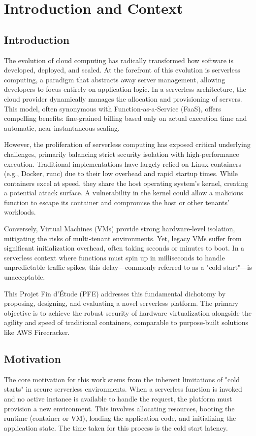 \chapter{Introduction and Context}

\section{Introduction}
The evolution of cloud computing has radically transformed how software is developed, deployed, and scaled. At the forefront of this evolution is serverless computing, a paradigm that abstracts away server management, allowing developers to focus entirely on application logic. In a serverless architecture, the cloud provider dynamically manages the allocation and provisioning of servers. This model, often synonymous with Function-as-a-Service (FaaS), offers compelling benefits: fine-grained billing based only on actual execution time and automatic, near-instantaneous scaling.

However, the proliferation of serverless computing has exposed critical underlying challenges, primarily balancing strict security isolation with high-performance execution. Traditional implementations have largely relied on Linux containers (e.g., Docker, runc) due to their low overhead and rapid startup times. While containers excel at speed, they share the host operating system's kernel, creating a potential attack surface. A vulnerability in the kernel could allow a malicious function to escape its container and compromise the host or other tenants' workloads.

Conversely, Virtual Machines (VMs) provide strong hardware-level isolation, mitigating the risks of multi-tenant environments. Yet, legacy VMs suffer from significant initialization overhead, often taking seconds or minutes to boot. In a serverless context where functions must spin up in milliseconds to handle unpredictable traffic spikes, this delay---commonly referred to as a "cold start"---is unacceptable.

This Projet Fin d'\'Etude (PFE) addresses this fundamental dichotomy by proposing, designing, and evaluating a novel serverless platform. The primary objective is to achieve the robust security of hardware virtualization alongside the agility and speed of traditional containers, comparable to purpose-built solutions like AWS Firecracker.

\section{Motivation}
The core motivation for this work stems from the inherent limitations of "cold starts" in secure serverless environments. When a serverless function is invoked and no active instance is available to handle the request, the platform must provision a new environment. This involves allocating resources, booting the runtime (container or VM), loading the application code, and initializing the application state. The time taken for this process is the cold start latency.

